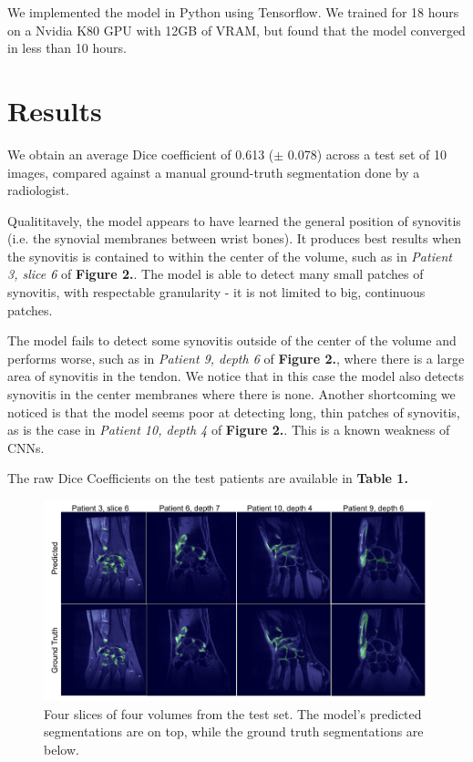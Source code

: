 \documentclass[11pt]{article}
\begin{document}
We implemented the model in Python using Tensorflow. We trained for 18 hours on a Nvidia K80 GPU with 12GB of VRAM, but found that the model converged in less than 10 hours.  

\newpage
\section{Results}

We obtain an average Dice coefficient of 0.613 ($\pm$ 0.078) across a test set of 10 images, compared against a manual ground-truth segmentation done by a radiologist.

Qualititavely, the model appears to have learned the general position of synovitis (i.e. the synovial membranes between wrist bones). It produces best results when the synovitis is contained to within the center of the volume, such as in \textit{Patient 3, slice 6} of \textbf{Figure 2.}. The model is able to detect many small patches of synovitis, with respectable granularity - it is not limited to big, continuous patches. 

The model fails to detect some synovitis outside of the center of the volume and performs worse, such as in \textit{Patient 9, depth 6} of \textbf{Figure 2.}, where there is a large area of synovitis in the tendon. We notice that in this case the model also detects synovitis in the center membranes where there is none. Another shortcoming we noticed is that the model seems poor at detecting long, thin patches of synovitis, as is the case in \textit{Patient 10, depth 4} of \textbf{Figure 2.}. This is a known weakness of CNNs.  

The raw Dice Coefficients on the test patients are available in \textbf{Table 1.}

\begin{figure}
\includegraphics[width=\textwidth]{figures/fig3.png}
\caption{Four slices of four volumes from the test set. The model's predicted segmentations are on top, while the ground truth segmentations are below.}
\end{figure}
\end{document}

